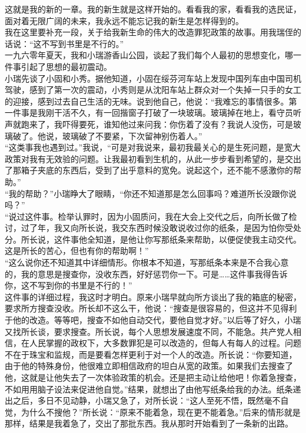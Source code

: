这就是我的新的一章。我的新生就是这样开始的。看看我的家，看看我的选民证，面对着无限广阔的未来，我永远不能忘记我的新生是怎样得到的。\\

我在这里要补充一段，关于给我新生命的伟大的改造罪犯政策的故事。用我瑞侄的话说：“这不写到书里是不行的。”\\

一九六零年夏天，我和小瑞游香山公园，谈起了我们每个人最初的思想变化，哪一件事引起了思想的最初震动。\\

小瑞先谈了小固和小秀。据他知道，小固在绥芬河车站上发现中国列车由中国司机驾驶，感到了第一次的震动，小秀则是从沈阳车站上群众对一个失掉一只手的女工的迎接，感到过去自己生活的无味。说到他自己，他说：“我难忘的事情很多。第一件事是我刚干活不久，有一回揩窗子打破了一块玻璃。玻璃掉在地上，看守员听声就跑来了，我吓得要死，谁知他过来问我：你伤着了没有？我说人没伤，可是玻璃破了。他说，玻璃破了不要紧，下次留神别伤着人。”\\

“这类事我也遇到过。”我说，“可是对我说来，最初我最关心的是生死问题，是宽大政策对我有无效验的问题。让我最初看到生机的，从此一步步看到希望的，是交出了那箱子夹底的东西后，受到了出乎意料的宽免。说起这个，还不能不感激你的帮助。”\\

“我的帮助？”小瑞睁大了眼睛，“你还不知道那是怎么回事吗？难道所长没跟你说吗？”\\

“说过这件事。检举认罪时，因为小固质问，我在大会上交代之后，向所长做了检讨，过了年，我又向所长说，我交东西时候没敢说收过你的纸条，是因为怕你受处分。所长说，这件事他全知道，是他让你写那纸条来帮助，以便促使我主动交代。这是所长的苦心，但也有你的帮助啊！”\\

“这么说你还不知道其中详细情形。你根本不知道，写那纸条本来是不合我心意的，我的意思是搜查你，没收东西，好好惩罚你一下。可是……这件事我得告诉你，这不写到你的书里是不行的！”\\

这件事的详细过程，我这时才明白。原来小瑞早就向所方谈出了我的箱底的秘密，要求所方搜查没收。所长却不这么干，他说：“搜查是很容易的，但这并不见得利于他的改造。等等吧，搜查不如他自动交代，要他自觉才好。”以后等了好久，小瑞又找所长谈，要求搜查。所长说，每个人思想发展速度不同，不能急。共产党人相信，在人民掌握的政权下，大多数罪犯是可以改造的，但每人有每人的过程。问题不在于珠宝和监规，而是要看怎样更利于对一个人的改造。所长说：“你要知道，由于他的特殊身份，他很难立即相信政府的坦白从宽的政策。如果我们去搜查了他，这就是让他失去了一次体验政策的机会。还是把主动让给他吧！你着急搜查，不如用用脑子设法来促进他自觉。”结果，就想出了由他写纸条给我的办法。纸条递出之后，多日不见动静，小瑞又急了，对所长说：“这人至死不悟，既然毫不自觉，为什么不搜他？”所长说：“原来不能着急，现在更不能着急。”后来的情形就是那样，结果是我着急了，交出了那批东西。我从那时开始看到了一条新的出路。\\

